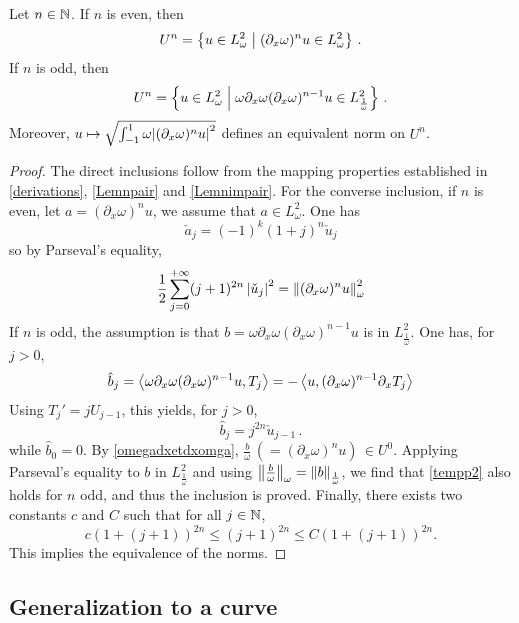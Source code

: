 \documentclass[a4paper]{article}
\begin{document}
\begin{Lem} 
	\label{LemEquivalentNormsUn}
	Let $n \in \mathbb{N}$. If $n$ is even, then
	\[U^n = \left\{u \in L^2_\omega\mathrel{}\middle|\mathrel{}(\partial_x \omega)^n u \in L^2_\omega\right\}\,.\]
	If $n$ is odd, then
	\[U^n = \left\{u \in L^2_\omega\mathrel{}\middle|\mathrel{}\omega \partial_x\omega (\partial_x \omega)^{n-1} u \in L^2_\frac{1}{\omega}\right\}\,.\]	
	Moreover, $u \mapsto \sqrt{\int_{-1}^{1} \omega {\left\lvert ( \partial_x \omega )^nu \right\rvert^2}}$ defines an equivalent norm on $U^n$. 
\end{Lem}
\begin{proof}
	The direct inclusions follow from the mapping properties established in \autoref{derivations}, \autoref{Lemnpair} and \autoref{Lemnimpair}. For the converse inclusion, if $n$ is even, let $a = (\partial_x \omega)^n u$, we assume that $a \in L^2_\omega$. One has 
	\[\check{a}_j = (-1)^k \left(1+j\right)^{n}\check{u}_j\] 
	so by Parseval's equality, 
	\begin{equation}
		\label{tempp2}
		\frac{1}{2}\sum_{j = 0 }^{+ \infty} (j+1)^{2n} \left\lvert \check{u}_j \right\rvert^2 = \left\|(\partial_x \omega)^nu\right\|^2_\omega
	\end{equation}
	If $n$ is odd, the assumption is that $b = \omega \partial_x \omega(\partial_x \omega)^{n-1}u$ is in $L^2_\frac{1}{\omega}$. One has, for $j > 0$, 
	\[\hat{b}_j = \left\langle \omega \partial_x \omega(\partial_x \omega)^{n-1}u,T_j\right\rangle = -\left\langle u,(\partial_x \omega)^{n-1} \partial_x T_j\right\rangle\]
	Using $T_j' = jU_{j-1}$, this yields, for $j > 0$,
	\[\hat{b}_j = j^{2n} \check{u}_{j-1}\,.\]
	while $\hat{b}_0 = 0$. By \autoref{omegadxetdxomga}, $\frac{b}{\omega} \,(= (\partial_x \omega)^n u)\, \in U^0$. Applying Parseval's equality to $b$ in $L^2_\frac{1}{\omega}$ and using $\left\|\frac{b}{\omega}\right\|_\omega = \left\|b\right\|_\frac{1}{\omega}$, we find that \eqref{tempp2} also holds for $n$ odd, and thus the inclusion is proved. Finally, there exists two constants $c$ and $C$ such that for all $j \in \mathbb{N}$, 
	\[c(1 + (j + 1))^{2n} \leq (j + 1)^{2n}  \leq C(1 + (j+1))^{2n}.\]
	This implies the equivalence of the norms.
	\end{proof}
	
\subsection{Generalization to a curve}
\end{document}
